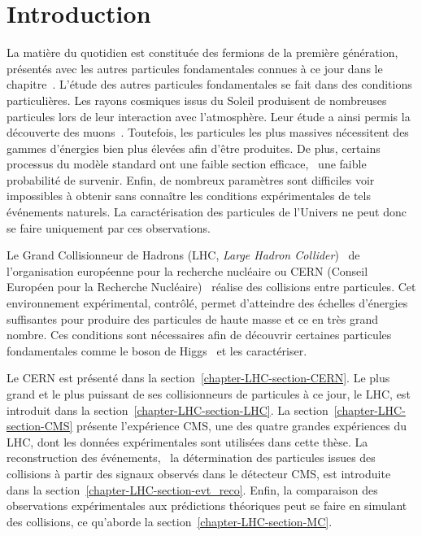 \section{Introduction}\label{chapter-LHC-section-introduction}
La matière \og du quotidien \fg{} est constituée des fermions de la première génération, présentés avec les autres particules fondamentales connues à ce jour dans le chapitre~.
L'étude des autres particules fondamentales se fait dans des conditions particulières.
Les rayons cosmiques issus du Soleil produisent de nombreuses particules lors de leur interaction avec l'atmosphère.
Leur étude a ainsi permis la découverte des muons~\cite{muon_discovery}.
Toutefois, les particules les plus massives nécessitent des gammes d'énergies bien plus élevées afin d'être produites.
De plus, certains processus du modèle standard ont une faible section efficace, \ie\ une faible probabilité de survenir.
Enfin, de nombreux paramètres sont difficiles voir impossibles à obtenir sans connaître les conditions expérimentales de tels événements naturels.
La caractérisation des particules de l'Univers ne peut donc se faire uniquement par ces observations.
\par Le Grand Collisionneur de Hadrons (LHC, \emph{Large Hadron Collider})~\cite{LHC_paper1,LHC_paper2,LHC_paper3} de l'organisation européenne pour la recherche nucléaire ou CERN (Conseil Européen pour la Recherche Nucléaire)~\cite{CERN_website} réalise des collisions entre particules.
Cet environnement expérimental, contrôlé, permet d'atteindre des échelles d'énergies suffisantes pour produire des particules de haute masse et ce en très grand nombre.
Ces conditions sont nécessaires afin de découvrir certaines particules fondamentales comme le boson de Higgs~\cite{ATLAS_Higgs_discovery,CMS_Higgs_discovery,CMS_Higgs_discovery_2013,ATLAS-CMS-Higgs_combined_1,ATLAS-CMS-Higgs_combined_2} et les caractériser.
\par Le CERN est présenté dans la section~\ref{chapter-LHC-section-CERN}.
Le plus grand et le plus puissant de ses collisionneurs de particules à ce jour, le LHC, est introduit dans la section~\ref{chapter-LHC-section-LHC}.
La section~\ref{chapter-LHC-section-CMS} présente l'expérience CMS, une des quatre grandes expériences du LHC, dont les données expérimentales sont utilisées dans cette thèse.
La reconstruction des événements, \ie\ la détermination des particules issues des collisions à partir des signaux observés dans le détecteur CMS, est introduite dans la section~\ref{chapter-LHC-section-evt_reco}.
Enfin, la comparaison des observations expérimentales aux prédictions théoriques peut se faire en simulant des collisions, ce qu'aborde la section~\ref{chapter-LHC-section-MC}.